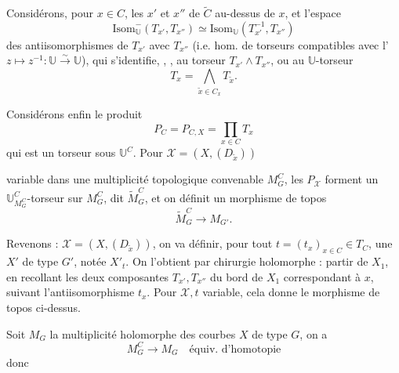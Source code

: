 \documentclass[11pt,a4paper]{article}
\begin{document}
Considérons, pour $x \in C$, les    $x'$
et $x''$ de $\widetilde{C}$ au-dessus de $x$, et  l'espace
\[
\mathrm{Isom}^{-}_{\mathbb{U}}(T_{x'}, T_{x''}) \simeq
\mathrm{Isom}_{\mathbb{U}}(T_{x'}^{-1}, T_{x''})
\]
des antiisomorphismes de $T_{x'}$ avec $T_{x''}$ (i.e. hom. de torseurs
compatibles avec l' 
$z \mapsto z^{-1} : \mathbb{U} \xrightarrow{\sim} \mathbb{U}$), qui
s'identifie, \ill{}, , au torseur
$T_{x'} \wedge T_{x''}$, ou  au $\mathbb{U}$-torseur
\[
T_x = \bigwedge_{\tilde{x} \in C_x} T_{\tilde{x}} .
\]


Considérons enfin le produit
\[
P_C = P_{C,X} = \prod_{x \in C} T_x
\]
qui est un torseur sous $\mathbb{U}^{C}$.  Pour
$\mathcal{X} = (X, (D_{\tilde{x}}))$

variable dans une multiplicité topologique convenable $M^C_G$, les
$P_{\mathcal{X}}$ forment un $\mathbb{U}^{C}_{M^C_G}$-torseur sur $M^C_G$, dit
$\widetilde{M}^C_G$, et on définit un  morphisme de topos
\[
\widetilde{M}^C_G \longrightarrow M_{G'} .
\]


Revenons : $\mathcal{X} = (X, (D_{\tilde{x}}))$, on va définir, pour tout
$t = (t_x)_{x \in C} \in T_C$, une \struck{\ill{}} $X'$ de type $G'$, notée
$X'_t$. On l'obtient par chirurgie holomorphe : partir de $X_1$, en recollant
 les deux composantes $T_{x'}, T_{x''}$ du bord de $X_1$
correspondant à $x$, suivant l'antiisomorphisme $t_x$. Pour $\mathcal{X}, t$
variable, cela donne le morphisme de topos ci-dessus.

Soit $M_G$ \struck{\ill{}} la multiplicité holomorphe des courbes $X$ de type
$G$, on a
\[
M^C_G \longrightarrow M_G \quad \text{équiv. d'homotopie}
\]
donc

\end{document}
